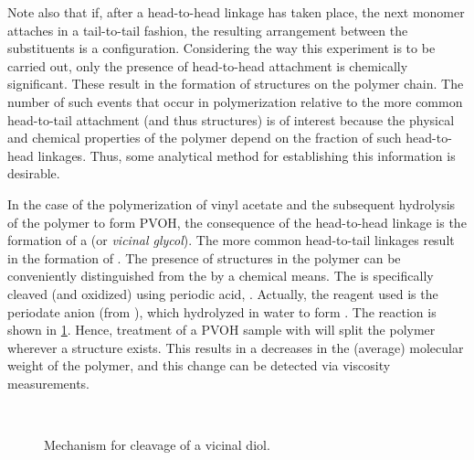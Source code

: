 Note also that if, after a head-to-head linkage has taken place, the next monomer attaches in a tail-to-tail fashion, the resulting arrangement between the substituents is a  configuration. 
Considering the way this experiment is to be carried out, only the presence of head-to-head attachment is chemically significant. 
These result in the formation of  structures on the polymer chain. The number of such events that occur in polymerization relative to the more common head-to-tail attachment (and thus  structures) is of interest because the physical and chemical properties of the polymer depend on the fraction of such head-to-head linkages. 
Thus, some analytical method for establishing this information is desirable. 

In the case of the polymerization of vinyl acetate and the subsequent hydrolysis of the polymer to form PVOH, the consequence of the head-to-head linkage is the formation of a  (or \emph{vicinal glycol}). 
The more common head-to-tail linkages result in the formation of . 
The presence of  structures in the polymer can be conveniently distinguished from the  by a chemical means. 
The  is specifically cleaved (and oxidized) using periodic acid, . 
Actually, the reagent used is the periodate anion (from ), which hydrolyzed in water to form .
The reaction is shown in \cref{fig:diol_cleavage}. 
Hence, treatment of a PVOH sample with  will split the polymer wherever a  structure exists. 
This results in a decreases in the (average) molecular weight of the polymer, and this change can be detected via viscosity measurements. 
\begin{figure}[htb]
	 \\
	\caption{Mechanism for cleavage of a vicinal diol.}
	\label{fig:diol_cleavage}
\end{figure}

